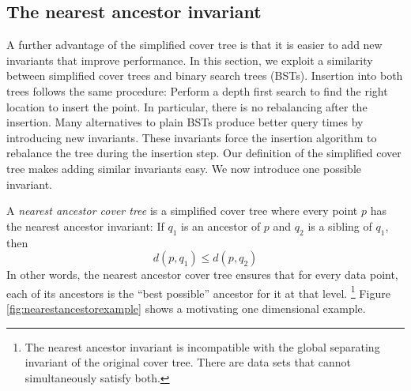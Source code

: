 \documentclass[thesis.tex]{subfiles}
\begin{document}

\subsection{The nearest ancestor invariant}

A further advantage of the simplified cover tree is that it is easier to add new invariants that improve performance.
In this section, we exploit a similarity between simplified cover trees and binary search trees (BSTs).
Insertion into both trees follows the same procedure:
Perform a depth first search to find the right location to insert the point.
In particular, there is no rebalancing after the insertion.
Many alternatives to plain BSTs produce better query times by introducing new invariants.
These invariants force the insertion algorithm to rebalance the tree during the insertion step.
Our definition of the simplified cover tree makes adding similar invariants easy.
We now introduce one possible invariant.

A \emph{nearest ancestor cover tree} is a simplified cover tree where every point $p$ has the nearest ancestor invariant:
If $q_1$ is an ancestor of $p$ and $q_2$ is a sibling of $q_1$, then
$$
d(p,q_1) \le d(p,q_2)
$$
In other words, the nearest ancestor cover tree ensures that for every data point, each of its ancestors is the ``best possible'' ancestor for it at that level.%
\footnote{
The nearest ancestor invariant is incompatible with the global separating invariant of the original cover tree.
There are data sets that cannot simultaneously satisfy both.
}
Figure \ref{fig:nearestancestorexample} shows a motivating one dimensional example.
\end{document}
